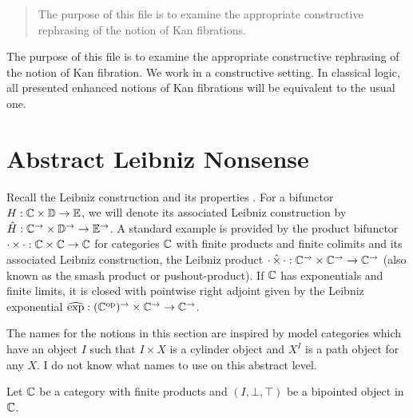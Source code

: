 \documentclass[reqno,10pt,a4paper,oneside]{amsart}
\begin{document}
\begin{abstract}
  The purpose of this file is to examine the appropriate constructive rephrasing of the notion of Kan fibrations.
\end{abstract}

The purpose of this file is to examine the appropriate constructive rephrasing of the notion of Kan fibration.
We work in a constructive setting.
In classical logic, all presented enhanced notions of Kan fibrations will be equivalent to the usual one. 

\section{Abstract Leibniz Nonsense}

Recall the Leibniz construction and its properties \cite[Section 4]{riehl-verity:reedy}.
For a bifunctor $H : \mathbb{C} \times \mathbb{D} \to \mathbb{E}$, we will denote its associated Leibniz construction by $\hat{H} : \mathbb{C}^{\to} \times \mathbb{D}^{\to} \to \mathbb{E}^{\to}$.
A standard example is provided by the product bifunctor $\mathop{\cdot} \times \mathop{\cdot} : \mathbb{C} \times \mathbb{C} \to \mathbb{C}$ for categories $\mathbb{C}$ with finite products and finite colimits and its associated Leibniz construction, the Leibniz product $\mathop{\cdot} \mathbin{\hat{\times}} \mathop{\cdot} : \mathbb{C}^{\to} \times \mathbb{C}^{\to} \to \mathbb{C}^{\to}$ (also known as the smash product or pushout-product).
If $\mathbb{C}$ has exponentials and finite limits, it is closed with pointwise right adjoint given by the Leibniz exponential $\operatorname{\widehat{exp}} : (\mathbb{C}^{\mathrm{op}})^{\to} \times \mathbb{C}^{\to} \to \mathbb{C}^{\to}$.

The names for the notions in this section are inspired by model categories which have an object $I$ such that $I \times X$ is a cylinder object and $X^I$ is a path object for any $X$.
I do not know what names to use on this abstract level.

Let $\mathbb{C}$ be a category with finite products and $(I, \bot, \top)$ be a bipointed object in $\mathbb{C}$.
\end{document}
